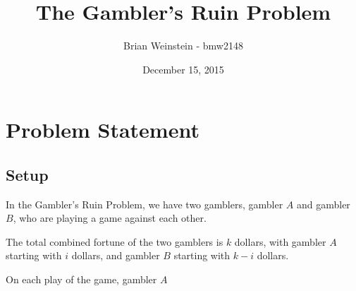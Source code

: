 \documentclass[a4paper,11pt]{article}
\title{The Gambler's Ruin Problem}
\author{Brian Weinstein - bmw2148}
\affil{Probability \& Statistics  (STAT-W4700), Columbia University, Fall 2015}
\date{December 15, 2015}
\begin{document}
\maketitle
\doublespacing



\section{Problem Statement}

\subsection{Setup}

In the Gambler's Ruin Problem, we have two gamblers, gambler $A$ and gambler $B$, who are playing a game against each other.

The total combined fortune of the two gamblers is $k$ dollars, with gambler $A$ starting with $i$ dollars, and gambler $B$ starting with $k-i$ dollars.

On each play of the game, gambler $A$ 
\end{document}
